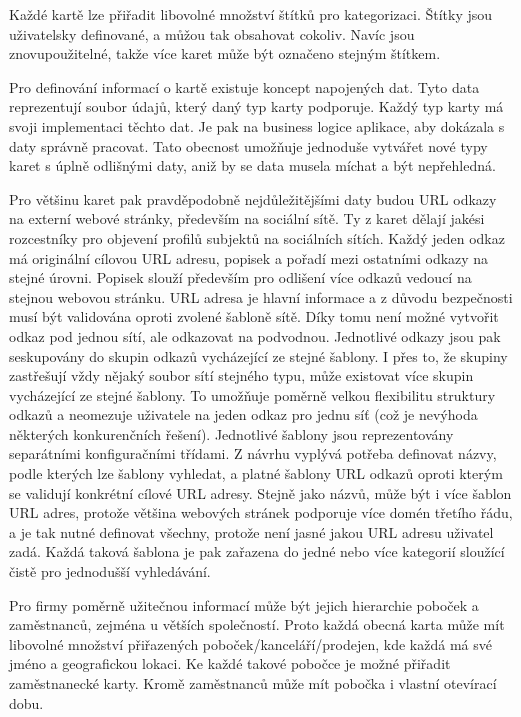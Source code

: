 		Každé kartě lze přiřadit libovolné množství štítků pro kategorizaci.
		Štítky jsou uživatelsky definované, a můžou tak obsahovat cokoliv.
		Navíc jsou znovupoužitelné, takže více karet může být označeno stejným štítkem.

		Pro definování informací o kartě existuje koncept napojených dat.
		Tyto data reprezentují soubor údajů, který daný typ karty podporuje.
		Každý typ karty má svoji implementaci těchto dat.
		Je pak na business logice aplikace, aby dokázala s daty správně pracovat.
		Tato obecnost umožňuje jednoduše vytvářet nové typy karet s úplně odlišnými daty, aniž by se data musela míchat
		a být nepřehledná.

		Pro většinu karet pak pravděpodobně nejdůležitějšími daty budou \ac{URL} odkazy na externí webové stránky,
		především na sociální sítě.
		Ty z karet dělají jakési rozcestníky pro objevení profilů subjektů na sociálních sítích.
		Každý jeden odkaz má originální cílovou \ac{URL} adresu, popisek a pořadí mezi ostatními odkazy na stejné úrovni.
		Popisek slouží především pro odlišení více odkazů vedoucí na stejnou webovou stránku.
		\ac{URL} adresa je hlavní informace a z důvodu bezpečnosti musí být validována oproti zvolené šabloně sítě.
		Díky tomu není možné vytvořit odkaz pod jednou sítí, ale odkazovat na podvodnou.
		Jednotlivé odkazy jsou pak seskupovány do skupin odkazů vycházející ze stejné šablony.
		I přes to, že skupiny zastřešují vždy nějaký soubor sítí stejného typu, může existovat více skupin vycházející ze
		stejné šablony.
		To umožňuje poměrně velkou flexibilitu struktury odkazů a neomezuje uživatele na jeden odkaz pro jednu síť (což je
		nevýhoda některých konkurenčních řešení).
		Jednotlivé šablony jsou reprezentovány separátními konfiguračními třídami.
		Z návrhu vyplývá potřeba definovat názvy, podle kterých lze šablony vyhledat, a platné šablony \ac{URL} odkazů
		oproti kterým se validují konkrétní cílové \ac{URL} adresy.
		Stejně jako názvů, může být i více šablon \ac{URL} adres, protože většina webových stránek podporuje více domén třetího řádu,
		a je tak nutné definovat všechny, protože není jasné jakou \ac{URL} adresu uživatel zadá.
		Každá taková šablona je pak zařazena do jedné nebo více kategorií sloužící čistě pro jednodušší vyhledávání.

		Pro firmy poměrně užitečnou informací může být jejich hierarchie poboček a zaměstnanců, zejména u větších společností.
		Proto každá obecná karta může mít libovolné množství přiřazených poboček/kanceláří/prodejen, kde každá má své jméno
		a geografickou lokaci.
		Ke každé takové pobočce je možné přiřadit zaměstnanecké karty.
		Kromě zaměstnanců může mít pobočka i vlastní otevírací dobu.

